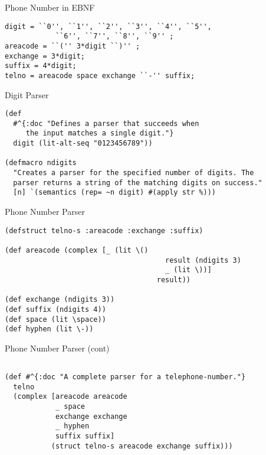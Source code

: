 \documentclass[presentation]{beamer}
\begin{document}
%
%
\begin{frame}[fragile]{Phone Number in \ac{EBNF}}
\begin{verbatim}
digit = ``0'', ``1'', ``2'', ``3'', ``4'', ``5'',
            ``6'', ``7'', ``8'', ``9'' ;
areacode = ``('' 3*digit ``)'' ;
exchange = 3*digit;
suffix = 4*digit;
telno = areacode space exchange ``-'' suffix;
\end{verbatim}
\end{frame}

\begin{frame}[fragile]{Digit Parser}
\begin{verbatim}
(def
  #^{:doc "Defines a parser that succeeds when
     the input matches a single digit."}
  digit (lit-alt-seq "0123456789"))

(defmacro ndigits
  "Creates a parser for the specified number of digits. The
  parser returns a string of the matching digits on success."
  [n] `(semantics (rep= ~n digit) #(apply str %)))
\end{verbatim}
\end{frame}

\begin{frame}[fragile]{Phone Number Parser}
\begin{verbatim}
(defstruct telno-s :areacode :exchange :suffix)

(def areacode (complex [_ (lit \()
                                      result (ndigits 3)
                                      _ (lit \))]
                                    result))

(def exchange (ndigits 3))
(def suffix (ndigits 4))
(def space (lit \space))
(def hyphen (lit \-))

\end{verbatim}
\end{frame}

\begin{frame}[fragile]{Phone Number Parser (cont)}
\begin{verbatim}

(def #^{:doc "A complete parser for a telephone-number."}
  telno
  (complex [areacode areacode
            _ space
            exchange exchange
            _ hyphen
            suffix suffix]
           (struct telno-s areacode exchange suffix)))

\end{verbatim}
\end{frame}
\end{document}
